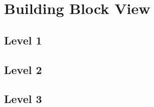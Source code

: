 
\chapter{Building Block View}
\label{chap:Building Block View}


\section{Level 1}
\label{sec:Level 1}


\section{Level 2}
\label{sec:Level 2}


\section{Level 3}
\label{sec:Level 3}
